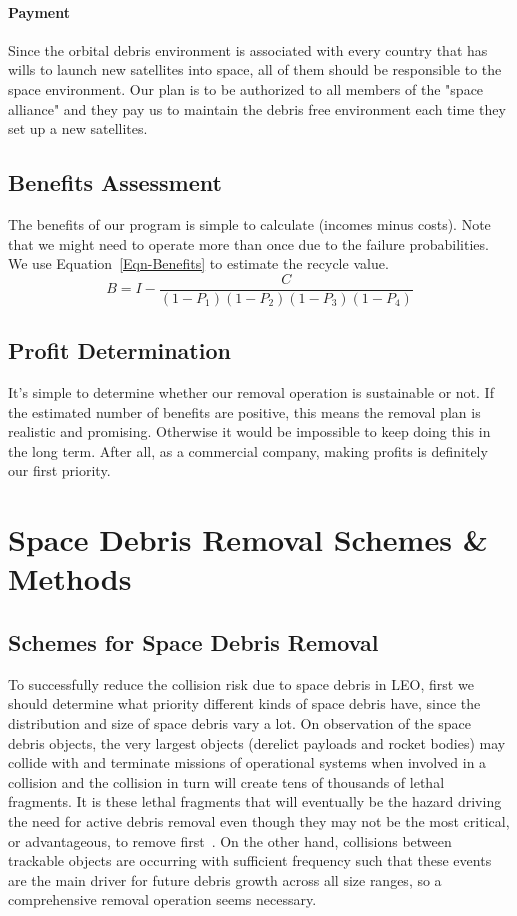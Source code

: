 \documentclass{mcmthesis}
\begin{document}
	\paragraph{Payment}
	Since the orbital debris environment is associated with every country that has wills to launch new satellites into space, all of them should be responsible to the space environment. Our plan is to be authorized to all members of the "space alliance" and they pay us to maintain the debris free environment each time they set up a new satellites.
	
\subsection{Benefits Assessment}
	The benefits of our program is simple to calculate (incomes minus costs). Note that we might need to operate more than once due to the failure probabilities. We use Equation~\eqref{Eqn-Benefits} to estimate the recycle value.
	\begin{equation}\label{Eqn-Benefits}
	B = I - \frac{C}{(1-P_1)(1-P_2)(1-P_3)(1-P_4)}
	\end{equation}
	
\subsection{Profit Determination}
	It's simple to determine whether our removal operation is sustainable or not. If the estimated number of benefits are positive, this means the removal plan is realistic and promising. Otherwise it would be impossible to keep doing this in the long term. After all, as a commercial company, making profits is definitely our first priority.
	
	
\section{Space Debris Removal Schemes \& Methods} \label{Sec-RemovelScheme}
	
\subsection{Schemes for Space Debris Removal}\label{Sec-Schemes}
	
	To successfully reduce the collision risk due to space debris in LEO, first we should determine what priority different kinds of space debris have, since the distribution and size of space debris vary a lot. On observation of the space debris objects, the very largest objects (derelict payloads and rocket bodies) may collide with and terminate missions of operational systems when involved in a collision and the collision in turn will create tens of thousands of lethal fragments. It is these lethal fragments that will eventually be the hazard driving the need for active debris removal even though they may not be the most critical, or advantageous, to remove first~\cite{McKnight}. On the other hand, collisions between trackable objects are occurring with sufficient frequency such that these events are the main driver for future debris growth across all size ranges, so a comprehensive removal operation seems necessary.
	
\end{document}
